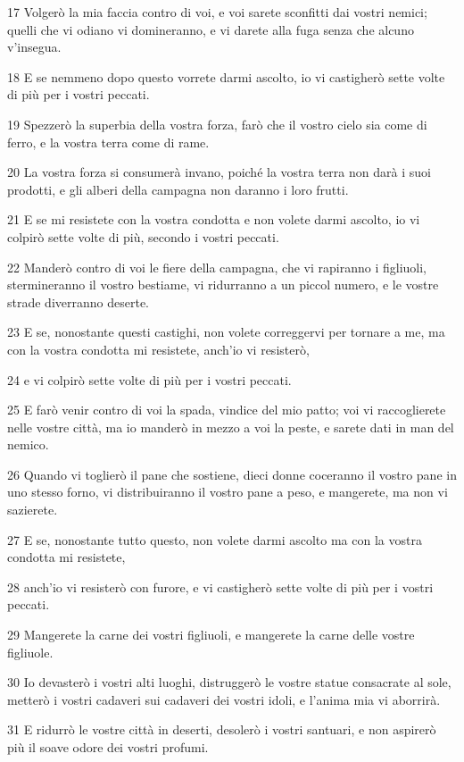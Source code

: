 \par 17 Volgerò la mia faccia contro di voi, e voi sarete sconfitti dai vostri nemici; quelli che vi odiano vi domineranno, e vi darete alla fuga senza che alcuno v'insegua.
\par 18 E se nemmeno dopo questo vorrete darmi ascolto, io vi castigherò sette volte di più per i vostri peccati.
\par 19 Spezzerò la superbia della vostra forza, farò che il vostro cielo sia come di ferro, e la vostra terra come di rame.
\par 20 La vostra forza si consumerà invano, poiché la vostra terra non darà i suoi prodotti, e gli alberi della campagna non daranno i loro frutti.
\par 21 E se mi resistete con la vostra condotta e non volete darmi ascolto, io vi colpirò sette volte di più, secondo i vostri peccati.
\par 22 Manderò contro di voi le fiere della campagna, che vi rapiranno i figliuoli, stermineranno il vostro bestiame, vi ridurranno a un piccol numero, e le vostre strade diverranno deserte.
\par 23 E se, nonostante questi castighi, non volete correggervi per tornare a me, ma con la vostra condotta mi resistete, anch'io vi resisterò,
\par 24 e vi colpirò sette volte di più per i vostri peccati.
\par 25 E farò venir contro di voi la spada, vindice del mio patto; voi vi raccoglierete nelle vostre città, ma io manderò in mezzo a voi la peste, e sarete dati in man del nemico.
\par 26 Quando vi toglierò il pane che sostiene, dieci donne coceranno il vostro pane in uno stesso forno, vi distribuiranno il vostro pane a peso, e mangerete, ma non vi sazierete.
\par 27 E se, nonostante tutto questo, non volete darmi ascolto ma con la vostra condotta mi resistete,
\par 28 anch'io vi resisterò con furore, e vi castigherò sette volte di più per i vostri peccati.
\par 29 Mangerete la carne dei vostri figliuoli, e mangerete la carne delle vostre figliuole.
\par 30 Io devasterò i vostri alti luoghi, distruggerò le vostre statue consacrate al sole, metterò i vostri cadaveri sui cadaveri dei vostri idoli, e l'anima mia vi aborrirà.
\par 31 E ridurrò le vostre città in deserti, desolerò i vostri santuari, e non aspirerò più il soave odore dei vostri profumi.
